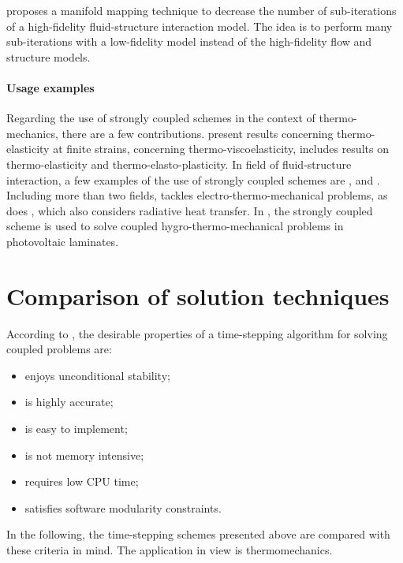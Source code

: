 \cite{blom_efficient_2017} proposes a manifold mapping technique to decrease the number of sub-iterations of a high-fidelity fluid-structure interaction model.
The idea is to perform many sub-iterations with a low-fidelity model instead of the high-fidelity flow and structure models.


\paragraph{Usage examples}

Regarding the use of strongly coupled schemes in the context of thermo-mechanics, there are a few contributions.
\cite{erbts_accelerated_2012} present results concerning thermo-elasticity at finite strains, \cite{netz_high-order_2013} concerning thermo-viscoelasticity, \cite{danowski_computational_2014} includes results on thermo-elasticity and thermo-elasto-plasticity.
In field of fluid-structure interaction, a few examples of the use of strongly coupled schemes are \cite{torii2006computer}, \cite{wall_strong_2007} and \cite{blom_efficient_2017}.
Including more than two fields, \cite{erbts_partitioned_2015} tackles electro-thermo-mechanical problems, as does \cite{wendt_partitioned_2015}, which also considers radiative heat transfer.
In \cite{lenarda_geometrical_2016}, the strongly coupled scheme is used to solve coupled hygro-thermo-mechanical problems in photovoltaic laminates.

\section{Comparison of solution techniques} \label{sec:comparison_sol_methods}

According to \cite{felippa_partitioned_1988}, the desirable properties of a time-stepping algorithm for solving coupled problems are:
\begin{itemize}
  \item enjoys unconditional stability;
  \item is highly accurate;
  \item is easy to implement;
  \item is not memory intensive;
  \item requires low CPU time;
  \item satisfies software modularity constraints.
  \end{itemize}
In the following, the time-stepping schemes presented above are compared with these criteria in mind.
The application in view is thermomechanics.

